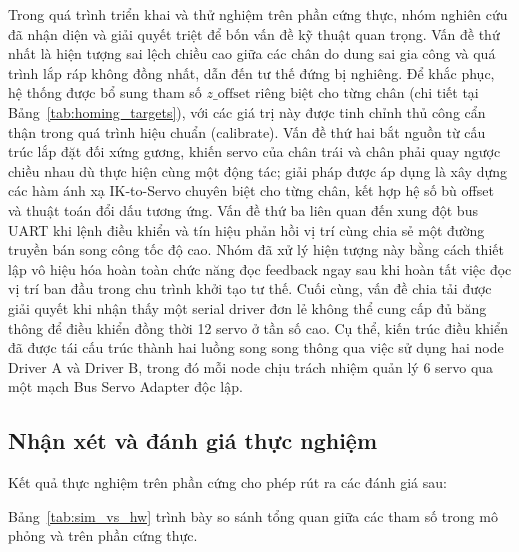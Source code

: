 Trong quá trình triển khai và thử nghiệm trên phần cứng thực, nhóm nghiên cứu đã nhận diện và giải quyết triệt để bốn vấn đề kỹ thuật quan trọng. Vấn đề thứ nhất là hiện tượng sai lệch chiều cao giữa các chân do dung sai gia công và quá trình lắp ráp không đồng nhất, dẫn đến tư thế đứng bị nghiêng. Để khắc phục, hệ thống được bổ sung tham số $z\_\text{offset}$ riêng biệt cho từng chân (chi tiết tại Bảng~\ref{tab:homing_targets}), với các giá trị này được tinh chỉnh thủ công cẩn thận trong quá trình hiệu chuẩn (calibrate). Vấn đề thứ hai bắt nguồn từ cấu trúc lắp đặt đối xứng gương, khiến servo của chân trái và chân phải quay ngược chiều nhau dù thực hiện cùng một động tác; giải pháp được áp dụng là xây dựng các hàm ánh xạ IK-to-Servo chuyên biệt cho từng chân, kết hợp hệ số bù offset và thuật toán đổi dấu tương ứng. Vấn đề thứ ba liên quan đến xung đột bus UART khi lệnh điều khiển và tín hiệu phản hồi vị trí cùng chia sẻ một đường truyền bán song công tốc độ cao. Nhóm đã xử lý hiện tượng này bằng cách thiết lập vô hiệu hóa hoàn toàn chức năng đọc feedback ngay sau khi hoàn tất việc đọc vị trí ban đầu trong chu trình khởi tạo tư thế. Cuối cùng, vấn đề chia tải được giải quyết khi nhận thấy một serial driver đơn lẻ không thể cung cấp đủ băng thông để điều khiển đồng thời 12 servo ở tần số cao. Cụ thể, kiến trúc điều khiển đã được tái cấu trúc thành hai luồng song song thông qua việc sử dụng hai node Driver A và Driver B, trong đó mỗi node chịu trách nhiệm quản lý 6 servo qua một mạch Bus Servo Adapter độc lập.

\subsection{Nhận xét và đánh giá thực nghiệm}

Kết quả thực nghiệm trên phần cứng cho phép rút ra các đánh giá sau:

Bảng~\ref{tab:sim_vs_hw} trình bày so sánh tổng quan giữa các tham số trong mô phỏng và trên phần cứng thực.

